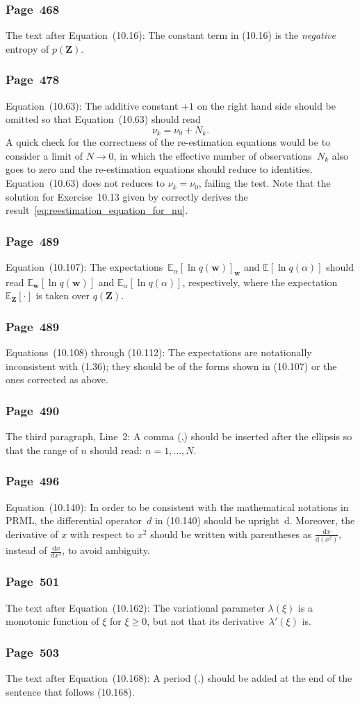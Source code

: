 \documentclass[12pt,a4paper]{article}
\newcommand{\erratum}[1]{\subsubsection*{#1}}
\begin{document}
\erratum{Page~468}
The text after Equation~(10.16):
The constant term in (10.16) is the \emph{negative} entropy of $p(\mathbf{Z})$.

\erratum{Page~478}
Equation~(10.63):
The additive constant $+1$ on the right hand side should be omitted so that
Equation~(10.63) should read
\begin{equation}
\nu_k = \nu_0 + N_k . \label{eq:reestimation_equation_for_nu}
\end{equation}
A quick check for the correctness of the re-estimation equations would be to consider
a limit of $N \to 0$, in which the effective number of observations~$N_k$ also goes to
zero and the re-estimation equations should reduce to identities.
Equation~(10.63) does not reduces to $\nu_k = \nu_0$, failing the test.
Note that the solution for Exercise~10.13 given by \citet{Svensen:PRML_web_solution} correctly
derives the result~\eqref{eq:reestimation_equation_for_nu}.

\erratum{Page~489}
Equation~(10.107):
The expectations~$\mathbb{E}_{\alpha}\left[ \ln q(\mathbf{w}) \right]_{\mathbf{w}}$ and
$\mathbb{E}\left[ \ln q(\alpha) \right]$ should read
$\mathbb{E}_{\mathbf{w}}\left[ \ln q(\mathbf{w}) \right]$ and
$\mathbb{E}_{\alpha}\left[ \ln q(\alpha) \right]$, respectively,
where the expectation~$\mathbb{E}_{\mathbf{Z}}[\cdot]$ is taken over $q\left(\mathbf{Z}\right)$.

\erratum{Page~489}
Equations~(10.108) through (10.112):
The expectations are notationally inconsistent with (1.36);
they should be of the forms shown in (10.107) or the ones corrected as above.

\erratum{Page~490}
The third paragraph, Line~2:
A comma (,) should be inserted after the ellipsis so that the range of $n$ should read:
$n = 1, \dots, N$.

\erratum{Page~496}
Equation~(10.140):
In order to be consistent with the mathematical notations in PRML,
the differential operator~$d$ in (10.140) should be upright~$\mathrm{d}$.
Moreover, the derivative of $x$ with respect to $x^2$ should be written with parentheses as
$\frac{\mathrm{d}x}{\mathrm{d}\left(x^2\right)}$,
instead of $\frac{\mathrm{d}x}{\mathrm{d}x^2}$, to avoid ambiguity.

\erratum{Page~501}
The text after Equation~(10.162):
The variational parameter $\lambda(\xi)$ is a monotonic function of $\xi$ for $\xi \ge 0$,
but not that its derivative~$\lambda'(\xi)$ is.

\erratum{Page~503}
The text after Equation~(10.168):
A period (.) should be added at the end of the sentence that follows (10.168).
\end{document}
